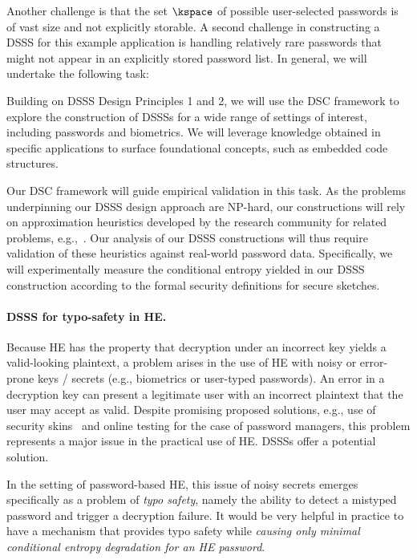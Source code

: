 Another challenge is that the set $\kspace$ of possible user-selected passwords is
of vast size and not explicitly storable. A second challenge in constructing a
DSSS for this example application is handling relatively rare passwords that
might not appear in an explicitly stored password list. In general, we will
undertake the following task:

\begin{task}
\label{task:dsss-cons}
Building on DSSS Design Principles 1 and 2, we will use the DSC framework to explore the construction of DSSSs for a wide range of settings of interest, including passwords and biometrics. We will leverage knowledge obtained in specific applications to surface foundational concepts, such as embedded code structures.
\end{task}

Our DSC framework will guide empirical validation in this task. As the problems
underpinning our DSSS design approach are NP-hard, our constructions will rely
on approximation heuristics developed by the research community for related
problems, e.g.,~\cite{BermanFurer:1994,Halldorsson:2000}. Our analysis of our DSSS constructions will thus require validation of
these heuristics against real-world password data. Specifically, we will
experimentally measure the conditional entropy yielded in our DSSS construction
according to the formal security definitions for secure sketches.

\paragraph{DSSS for typo-safety in HE.} Because HE has the property that
decryption under an incorrect key yields a valid-looking plaintext, a problem
arises in the use of HE with noisy or error-prone keys / secrets (e.g.,
biometrics or user-typed passwords). An error in a decryption key can present a
legitimate user with an incorrect plaintext that the user may accept as valid. Despite promising proposed solutions, e.g., use of security skins~\cite{dhamija2005battle} and online testing for the case of password managers, this problem represents a major issue in the practical use of HE. DSSSs offer a potential solution.

In the setting of password-based HE, this issue of noisy secrets emerges specifically as a
problem of {\em typo safety}, namely the ability to detect a mistyped password
and trigger a decryption failure. It would be very helpful in practice to have a
mechanism that provides typo safety while {\em causing only minimal conditional
entropy degradation for an HE password}.

